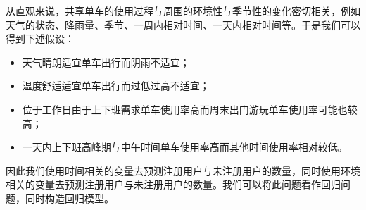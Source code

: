 从直观来说，共享单车的使用过程与周围的环境性与季节性的变化密切相关，例如天气的状态、降雨量、季节、一周内相对时间、一天内相对时间等。于是我们可以得到下述假设：
\begin{itemize}
    \item 天气晴朗适宜单车出行而阴雨不适宜；
    \item 温度舒适适宜单车出行而过低过高不适宜；
    \item 位于工作日由于上下班需求单车使用率高而周末出门游玩单车使用率可能也较高；
    \item 一天内上下班高峰期与中午时间单车使用率高而其他时间使用率相对较低。
\end{itemize}
因此我们使用时间相关的变量去预测注册用户与未注册用户的数量，同时使用环境相关的变量去预测注册用户与未注册用户的数量。我们可以将此问题看作回归问题，同时构造回归模型。
